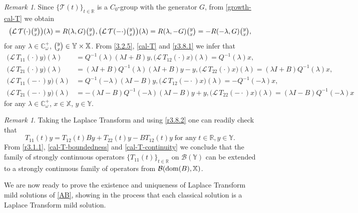 \documentclass[11pt]{amsart}
\numberwithin{equation}{section}
\newcommand{\RR}{{\mathbb R}}
\theoremstyle{remark}
\newtheorem{remark}[theorem]{Remark}
\theoremstyle{definition}
\newcommand\cT{{\mathcal T}}
\newcommand\bX{{\mathbb X}}
\newcommand\bY{{\mathbb Y}}
\newcommand{\dom}{\text{\rm{dom}}}
\begin{document}
\begin{remark}\label{r3.8}
Since $\{\cT(t)\}_{t \in \mathbb{R}}$ is a $C_0$-group with the generator $G$, from  \eqref{growth-cal-T} we obtain
\begin{equation}\label{r3.8.1}
		\bigl(\mathcal{L}\,\cT(\cdot)\tbinom{y}{x}\bigr)(\lambda)
		= R(\lambda, G)\tbinom{y}{x}, 
		\bigl(\mathcal{L}\,\cT(-\cdot)\tbinom{y}{x}\bigr)(\lambda)
		= R(\lambda, -G)\tbinom{y}{x} = -R(-\lambda, G)\tbinom{y}{x}, 
\end{equation}
for any $\lambda \in \mathbb{C}_\omega^+$, $\tbinom{y}{x} \in \bY \times \bX$. From \eqref{3.2.5}, \eqref{cal-T} and \eqref{r3.8.1} we infer that
\begin{align}\label{r3.8.2}
		\bigl(\mathcal{L}\,T_{11}(\cdot)y\bigr)(\lambda) &= Q^{-1}(\lambda)(\lambda I+B)y, 
		\bigl(\mathcal{L}\,T_{12}(\cdot)x\bigr)(\lambda) = Q^{-1}(\lambda)x,\\
		\bigl(\mathcal{L}\,T_{21}(\cdot)y\bigr)(\lambda) &= (\lambda I+B)Q^{-1}(\lambda)(\lambda I+B)y - y, 
		\bigl(\mathcal{L}\,T_{22}(\cdot)x\bigr)(\lambda)= (\lambda I+B)Q^{-1}(\lambda)x, \nonumber \\
		\bigl(\mathcal{L}\,T_{11}(-\cdot)y\bigr)(\lambda) &= Q^{-1}(-\lambda)(\lambda I-B)y, 
		\bigl(\mathcal{L}\,T_{12}(-\cdot)x\bigr)(\lambda) = -Q^{-1}(-\lambda)x, \nonumber \\
		\bigl(\mathcal{L}\,T_{21}(-\cdot)y\bigr)(\lambda) &= -(\lambda I-B)Q^{-1}(-\lambda)(\lambda I-B)y + y, 
		\bigl(\mathcal{L}\,T_{22}(-\cdot)x\bigr)(\lambda)= (\lambda I-B)Q^{-1}(-\lambda)x\nonumber 
	\end{align}
	for any $\lambda \in \mathbb{C}_\omega^+$, $x \in \bX$, $y \in \bY$.
\end{remark}
\begin{remark}\label{r3.9}
Taking the Laplace Transform and using \eqref{r3.8.2} one can readily check that
\begin{equation}\label{r3.9.1}
T_{11}(t)y = T_{12}(t)By + T_{22}(t)y - BT_{12}(t)y\;\mbox{for any}\;t\in\RR, y\in\bY. 
\end{equation}
From \eqref{r3.1.1}, \eqref{cal-T-boundedness} and \eqref{cal-T-continuity}
we conclude that the family of strongly continuous operators $\{T_{11}(t)\}_{t\in\mathbb{R}}$ on $\mathcal{B}(\bY)$ can be extended to a strongly continuous family of operators from $\mathcal{B}(\dom(B),\bX)$.
\end{remark}
We are now ready to prove the existence and uniqueness of Laplace Transform mild solutions of \eqref{AB}, showing in the process that each classical solution is a Laplace Transform mild solution.
\end{document}
